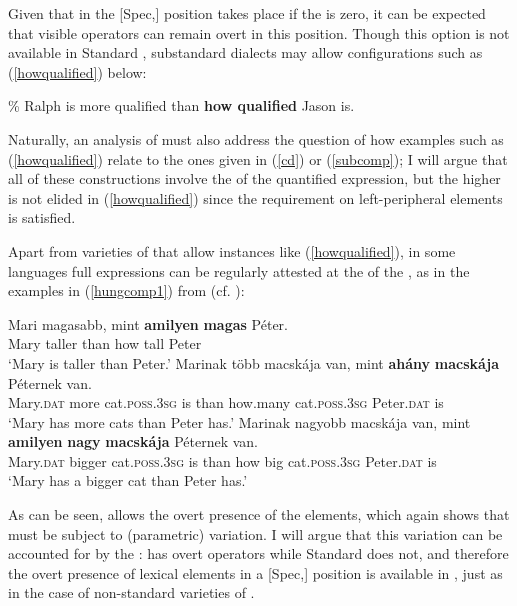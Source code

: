 Given that  in the [Spec,] position takes place if the  is zero, it can be expected that visible operators can remain overt in this position. Though this option is not available in Standard , substandard dialects may allow configurations such as (\ref{howqualified}) below:

\ea	\% Ralph is more qualified than \textbf{how qualified} Jason is. \label{howqualified}
\z

Naturally, an analysis of  must also address the question of how examples such as (\ref{howqualified}) relate to the ones given in (\ref{cd}) or (\ref{subcomp}); I will argue that all of these constructions involve the  of the quantified expression, but the higher  is not elided in (\ref{howqualified}) since the  requirement on left-peripheral elements is satisfied.

Apart from varieties of  that allow instances like (\ref{howqualified}), in some languages full  expressions can be regularly attested at the  of the , as in the examples in (\ref{hungcomp1}) from  (cf. \citealt{kenesei1992}):

\largerpage[-2]
\ea \label{hungcomp1}
\ea \gll Mari magasabb, mint \textbf{amilyen} \textbf{magas} P\'eter. \label{hungpredfull}\\
Mary taller than how tall Peter\\
\glt `Mary is taller than Peter.'
\ex \gll Marinak t\"{o}bb macsk\'aja van, mint \textbf{ah\'any} \textbf{macsk\'aja} P\'eternek van.\\
Mary.\textsc{dat} more cat.\textsc{poss.3sg} is than how.many cat.\textsc{poss.3sg} Peter.\textsc{dat} is\\
\glt `Mary has more cats than Peter has.'
\ex \gll Marinak nagyobb macsk\'aja van, mint \textbf{amilyen} \textbf{nagy} \textbf{macsk\'aja} P\'eternek van.\\
Mary.\textsc{dat} bigger cat.\textsc{poss.3sg} is than how big	cat.\textsc{poss.3sg} Peter.\textsc{dat} is\\
\glt `Mary has a bigger cat than Peter has.'
\z
\z

As can be seen,  allows the overt presence of the  elements, which again shows that  must be subject to (parametric) variation. I will argue that this variation can be accounted for by the :  has overt operators while Standard  does not, and therefore the overt presence of lexical elements in a [Spec,] position is available in , just as in the case of non-standard varieties of .

